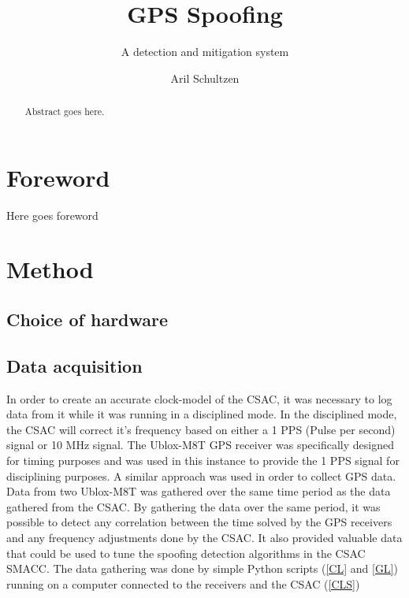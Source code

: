 \documentclass[12pt,english,a4paper]{report}
\title{GPS Spoofing}
\subtitle{A detection and mitigation system}
\author{Aril Schultzen}
\begin{document}
\duoforside[dept={Institutt for informatikk},
program={Informatikk: programmering og nettverk},
long]

\begin{abstract}
Abstract goes here.
\end{abstract}

\chapter*{Foreword}
Here goes foreword

\thispagestyle{empty}
\setcounter{page}{0}
\tableofcontents
\thispagestyle{empty}
\setcounter{page}{0}
\thispagestyle{empty}
\setcounter{page}{0}
\clearpage
\setcounter{page}{1}





\chapter{Method}
\section{Choice of hardware}


\section{Data acquisition}
In order to create an accurate clock-model of the CSAC, it was necessary to log data from it while it was running in a disciplined mode. In the disciplined mode, the CSAC will correct it's frequency based on either a 1 PPS (Pulse per second) signal or 10 MHz signal. The Ublox-M8T GPS receiver was specifically designed for timing purposes and was used in this instance to provide the 1 PPS signal for disciplining purposes. A similar approach was used in order to collect GPS data. Data from two Ublox-M8T was gathered over the same time period as the data gathered from the CSAC. By gathering the data over the same period, it was possible to detect any correlation between the time solved by the GPS receivers and any frequency adjustments done by the CSAC. It also provided valuable data that could be used to tune the spoofing detection algorithms in the CSAC SMACC. The data gathering was done by simple Python scripts (\ref{CL} and \ref{GL}) running on a computer connected to the receivers and the CSAC (\ref{CLS})
\end{document}

